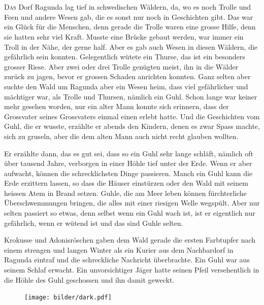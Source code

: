 \chapter*{}
\lettrine[lines=3]{\color{red}D}{as} Dorf Ragunda lag tief in schwedischen Wäldern, da, wo es noch Trolle und Feen und andere Wesen gab, die es sonst nur noch in Geschichten gibt. Das war ein Glück für die Menschen, denn gerade die Trolle waren eine grosse Hilfe, denn sie hatten sehr viel Kraft. Musste eine Brücke gebaut werden, war immer ein Troll in der Nähe, der gerne half. Aber es gab auch Wesen in diesen Wäldern, die gefährlich sein konnten. Gelegentlich wütete ein Thurse, das ist ein besonders grosser Riese. Aber zwei oder drei Trolle genügten meist, ihn in die Wälder zurück zu jagen, bevor er grossen Schaden anrichten konnten. Ganz selten aber suchte den Wald um Ragunda aber ein Wesen heim, dass viel gefährlicher und mächtiger war, als Trolle und Thursen, nämlich ein Guhl. Schon lange war keiner mehr gesehen worden, nur ein alter Mann konnte sich erinnern, dass der Grossvater seines Grossvaters einmal einen erlebt hatte. Und die Geschichten vom Guhl, die er wusste, erzählte er abends den Kindern, denen es zwar Spass machte, sich zu gruseln, aber die dem alten Mann auch nicht recht glauben wollten. 

Er erzählte dann, das es gut sei, dass so ein Guhl sehr lange schläft, nämlich oft über tausend Jahre, verborgen in einer Höhle tief unter der Erde. Wenn er aber aufwacht, können die schrecklichsten Dinge passieren. Manch ein Guhl kann die Erde erzittern lassen, so dass die Häuser einstürzen oder den Wald mit seinem heissen Atem in Brand setzen. Guhle, die am Meer leben können fürchterliche Überschwemmungen bringen, die alles mit einer riesigen Welle wegspült. Aber nur selten passiert so etwas, denn selbst wenn ein Guhl wach ist, ist er eigentlich nur gefährlich, wenn er wütend ist und das sind Guhle selten.

Krokusse und Adonisröschen gaben dem Wald gerade die ersten Farbtupfer nach einem strengen  und langen Winter als ein Kurier aus dem Nachbardorf in Ragunda eintraf und die schreckliche Nachricht überbrachte. Ein Guhl war aus seinem Schlaf erwacht. Ein unvorsichtiger Jäger hatte seinen Pfeil versehentlich in die Höhle des Guhl geschossen und ihn damit geweckt.

\begin{figure}[hb]
\centering
\texttt{[image: bilder/dark.pdf]}
\end{figure}

